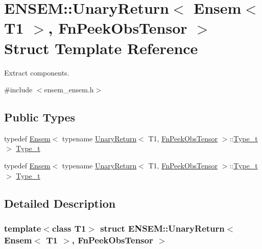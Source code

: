 \hypertarget{structENSEM_1_1UnaryReturn_3_01Ensem_3_01T1_01_4_00_01FnPeekObsTensor_01_4}{}\section{E\+N\+S\+EM\+:\+:Unary\+Return$<$ Ensem$<$ T1 $>$, Fn\+Peek\+Obs\+Tensor $>$ Struct Template Reference}
\label{structENSEM_1_1UnaryReturn_3_01Ensem_3_01T1_01_4_00_01FnPeekObsTensor_01_4}


Extract components.  




{\ttfamily \#include $<$ensem\+\_\+ensem.\+h$>$}

\subsection*{Public Types}
\begin{DoxyCompactItemize}
\item 
typedef \mbox{\hyperlink{classENSEM_1_1Ensem}{Ensem}}$<$ typename \mbox{\hyperlink{structENSEM_1_1UnaryReturn}{Unary\+Return}}$<$ T1, \mbox{\hyperlink{structENSEM_1_1FnPeekObsTensor}{Fn\+Peek\+Obs\+Tensor}} $>$\+::\mbox{\hyperlink{structENSEM_1_1UnaryReturn_3_01Ensem_3_01T1_01_4_00_01FnPeekObsTensor_01_4_a6f60fb6656ccc4fbc31cc64aa1face1f}{Type\+\_\+t}} $>$ \mbox{\hyperlink{structENSEM_1_1UnaryReturn_3_01Ensem_3_01T1_01_4_00_01FnPeekObsTensor_01_4_a6f60fb6656ccc4fbc31cc64aa1face1f}{Type\+\_\+t}}
\item 
typedef \mbox{\hyperlink{classENSEM_1_1Ensem}{Ensem}}$<$ typename \mbox{\hyperlink{structENSEM_1_1UnaryReturn}{Unary\+Return}}$<$ T1, \mbox{\hyperlink{structENSEM_1_1FnPeekObsTensor}{Fn\+Peek\+Obs\+Tensor}} $>$\+::\mbox{\hyperlink{structENSEM_1_1UnaryReturn_3_01Ensem_3_01T1_01_4_00_01FnPeekObsTensor_01_4_a6f60fb6656ccc4fbc31cc64aa1face1f}{Type\+\_\+t}} $>$ \mbox{\hyperlink{structENSEM_1_1UnaryReturn_3_01Ensem_3_01T1_01_4_00_01FnPeekObsTensor_01_4_a6f60fb6656ccc4fbc31cc64aa1face1f}{Type\+\_\+t}}
\end{DoxyCompactItemize}


\subsection{Detailed Description}
\subsubsection*{template$<$class T1$>$\newline
struct E\+N\+S\+E\+M\+::\+Unary\+Return$<$ Ensem$<$ T1 $>$, Fn\+Peek\+Obs\+Tensor $>$}

